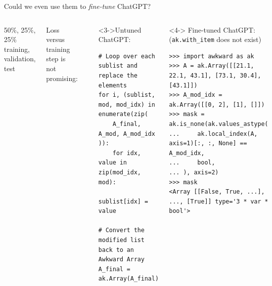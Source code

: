 \documentclass[aspectratio=169]{beamer}
\begin{document}
\begin{frame}[fragile]{Could we even use them to {\it fine-tune} ChatGPT?}
\vspace{0.35 cm}
\begin{columns}
50\%, 25\%, 25\% training, validation, test

\vspace{0.25 cm}
Loss versus training step is not promising:

\vspace{0.25 cm}
\includegraphics[width=\linewidth]{PLOTS/stackoverflow-finetune-loss.pdf}

\vspace{0.25 cm}

\begin{uncoverenv}<3->Untuned ChatGPT:

\tiny
\vspace{0.1 cm}
\begin{verbatim}
# Loop over each sublist and replace the elements
for i, (sublist, mod, mod_idx) in enumerate(zip(
    A_final, A_mod, A_mod_idx
)):
    for idx, value in zip(mod_idx, mod):
        sublist[idx] = value

# Convert the modified list back to an Awkward Array
A_final = ak.Array(A_final)
\end{verbatim}
\end{uncoverenv}

\vspace{0.25 cm}
\begin{uncoverenv}<4->
\normalsize
Fine-tuned ChatGPT: {\scriptsize (\texttt{ak.with_item} does not exist)}

\tiny
\vspace{0.1 cm}
\begin{verbatim}
>>> import awkward as ak
>>> A = ak.Array([[21.1, 22.1, 43.1], [73.1, 30.4], [43.1]])
>>> A_mod_idx = ak.Array([[0, 2], [1], []])
>>> mask = ak.is_none(ak.values_astype(
...     ak.local_index(A, axis=1)[:, :, None] == A_mod_idx,
...     bool,
... ), axis=2)
>>> mask
<Array [[False, True, ...], ..., [True]] type='3 * var * bool'>


\end{verbatim}
\end{uncoverenv}
\end{columns}
\end{frame}
\end{document}
